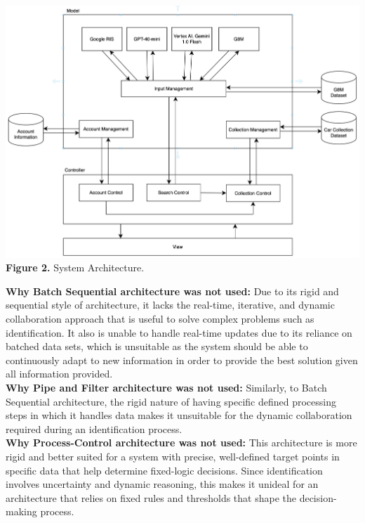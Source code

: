 \documentclass[]{article}
\begin{document}
\begin{center}
\includegraphics[scale=0.5]{images/system_architecture.png}
\textbf{Figure 2.} System Architecture.\\
\end{center}

\noindent \textbf{Why Batch Sequential architecture was not used:} Due to its rigid and sequential style of architecture, it lacks the real-time, iterative, and dynamic collaboration approach that is useful to solve complex problems such as identification. It also is unable to handle real-time updates due to its reliance on batched data sets, which is unsuitable as the system should be able to continuously adapt to new information in order to provide the best solution given all information provided.\\

\noindent \textbf{Why Pipe and Filter architecture was not used:} Similarly, to Batch Sequential architecture, the rigid nature of having specific defined processing steps in which it handles data makes it unsuitable for the dynamic collaboration required during an identification process.\\

\noindent \textbf{Why Process-Control architecture was not used:} This architecture is more rigid and better suited for a system with precise, well-defined target points in specific data that help determine fixed-logic decisions. Since identification involves uncertainty and dynamic reasoning, this makes it unideal for an architecture that relies on fixed rules and thresholds that shape the decision-making process.\\
\end{document}
